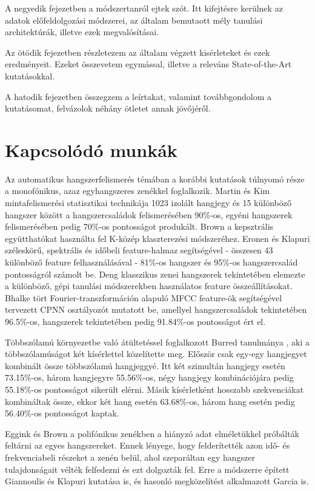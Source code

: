 A negyedik fejezetben a módszertanról ejtek szót. Itt kifejtésre kerülnek az adatok előfeldolgozási módszerei, az általam bemutaott mély tanulási architektúrák, illetve ezek megvalósításai.

Az ötödik fejezetben részletezem az általam végzett kisérleteket és ezek eredményeit. Ezeket összevetem egymással, illetve a releváns State-of-the-Art kutatásokkal.

A hatodik fejezetben összegzem a leírtakat, valamint továbbgondolom a kutatásomat, felvázolok néhány ötletet annak jövőjéről.


\section{Kapcsolódó munkák}

Az automatikus hangszerfelismerés témában a korábbi kutatások túlnyomó része a monofónikus, azaz egyhangszeres zenékkel foglalkozik. Martin és Kim \cite{Martin1998} mintafelismerési statisztikai technikája 1023 izolált hangjegy és 15 különböző hangszer között a hangszercsaládok felismerésében 90\%-os, egyéni hangszerek felismerésében pedig 70\%-os pontosságot produkált. Brown \cite{brown1999} a kepsztrális együtthatókat használta fel K-közép klaszterezési módszeréhez. Eronen és Klapuri \cite{eronenklapuri2000} széleskörű, spektrális és időbeli feature-halmaz segítségével - összesen 43 különböző feature felhasználásával - 81\%-os hangszer és 95\%-os hangszercsalád pontosságról számolt be. Deng \cite{deng2008} klasszikus zenei hangszerek tekintetében elemezte a különböző, gépi tanulási módszerekben használatos feature összeállításokat. Bhalke \cite{bhalke2015} tört Fourier-transzformáción alapuló MFCC feature-ök segítségével tervezett CPNN osztályozót mutatott be, amellyel hangszercsaládok tekintetében 96.5\%-os, hangszerek tekintetében pedig 91.84\%-os pontosságot ért el.

Többszólamú környezetbe való átültetéssel foglalkozott Burred tanulmánya \cite{burred2010}, aki a többszólamúságot két kísérlettel közelítette meg. Először csak egy-egy hangjegyet kombinált össze többszólamú hangjeggyé. Itt két szimultán hangjegy esetén 73.15\%-os, három hangjegyre 55.56\%-os, négy hangjegy kombinációjára pedig 55.18\%-os pontosságot sikerült elérni. Másik kísérletként hosszabb szekvenciákat kombináltak össze, ekkor két hang esetén 63.68\%-os, három hang esetén pedig 56.40\%-os pontosságot kaptak. 

Eggink és Brown \cite{egginkandbrown2003} a polifónikus zenékben a hiányzó adat elméletükkel próbálták feltárni az egyes hangszereket. Ennek lényege, hogy felderítették azon idő- és frekvenciabeli részeket a zenén belül, ahol szeparáltan egy hangszer tulajdonságait vélték felfedezni és ezt dolgozták fel. Erre a módszerre épített Giannoulis és Klapuri \cite{giannoulisandklapuri2013} kutatása is, és hasonló megközelítést alkalmazott Garcia \cite{garcia2011} is.
 
